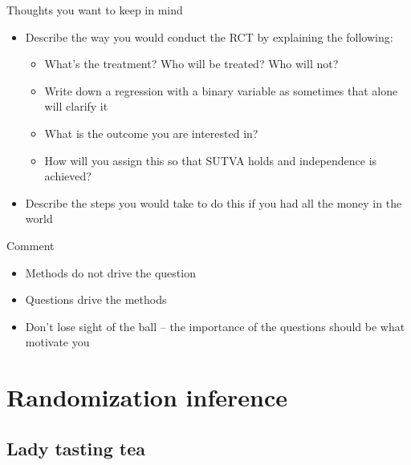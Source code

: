 \documentclass{beamer}
\begin{document}
\begin{frame}{Thoughts you want to keep in mind}

  \begin{itemize}
    \item Describe the way you would conduct the RCT by explaining the following:
          \begin{itemize}
            \item What's the treatment?  Who will be treated? Who will not?
            \item Write down a regression with a binary variable as sometimes that alone will clarify it
            \item What is the outcome you are interested in?
            \item How will you assign this so that SUTVA holds and independence is achieved?
          \end{itemize}
    \item Describe the steps you would take to do this if you had all the money in the world
  \end{itemize}

\end{frame}

\begin{frame}{Comment}

\begin{itemize}

\item Methods do not drive the question
\item Questions drive the methods
\item Don't lose sight of the ball -- the importance of the questions should be what motivate you

\end{itemize}

\end{frame}

\section{Randomization inference}

\subsection{Lady tasting tea}
\end{document}
